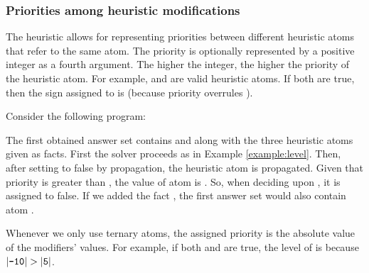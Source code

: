 \subsubsection{Priorities among heuristic modifications}

The  heuristic allows for representing priorities between different heuristic atoms that refer to the same atom.
The priority is optionally represented by a positive integer as a fourth argument.
The higher the integer, the higher the priority of the heuristic atom.
For example,  and  are valid heuristic atoms.
If both are true, then the sign assigned to  is  (because priority  overrules ).  

\begin{example}
\label{example:priority}
Consider the following program:

The first obtained answer set contains  and  along with the three heuristic atoms given as facts.
First the solver proceeds as in Example \ref{example:level}. 
Then, after setting  to false by propagation, 
the heuristic atom  is propagated.
Given that priority  is greater than ,
the  value of atom  is .
So, when deciding upon , it is assigned to false.
If we added the fact , 
the first answer set would also contain atom .
\end{example}

\begin{note}
Whenever we only use ternary  atoms, 
the assigned priority is the absolute value of the modifiers' values.
For example, 
if both  and  are true,
the level of  is  because $|\code{-10}|>|\code{5}|$.
\end{note}

